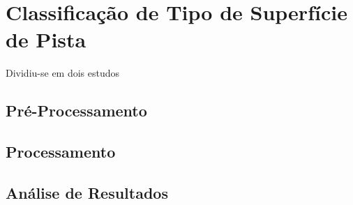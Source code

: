 \chapter{Classificação de Tipo de Superfície de Pista}
\label{cap:classificacao_tipo_superficie}

Dividiu-se em dois estudos

\section{Pré-Processamento}
\section{Processamento}
\section{Análise de Resultados}